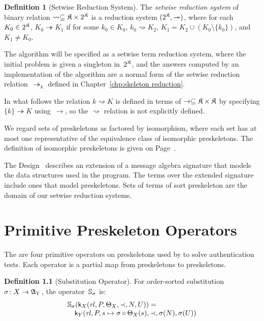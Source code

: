 \documentclass[12pt]{report}
\theoremstyle{definition}
\newtheorem{defn}{Definition}[chapter]
\newcommand{\skel}{\mathsf{k}}
\newcommand{\rl}{\fn{rl}}
\begin{document}
\begin{defn}[Setwise Reduction System]
The \emph{setwise reduction system} of
binary relation $\rightsquigarrow\subseteq\mathfrak K\times2^{\mathfrak K}$
is a reduction system $(2^{\mathfrak K},\twoheadrightarrow)$, where for
each $K_0\in2^{\mathfrak K}$, $K_0\twoheadrightarrow K_1$ if for some
$k_0\in K_0$, $k_0\rightsquigarrow K_2$, $K_1=K_2\cup
(K_0\setminus\{k_0\})$, and $K_1\neq K_0$.
\end{defn}

The {\cpsa} algorithm will be specified as a setwise term reduction
system, where the initial problem is given a singleton
in~$2^{\mathfrak K}$, and the answers computed by an implementation of
the algorithm are a normal form of the setwise reduction
relation~$\twoheadrightarrow_k$ defined in Chapter~\ref{chp:skeleton
  reduction}.

In what follows the relation $k\rightsquigarrow K$ is defined in terms
of $\to\subseteq\mathfrak K\times\mathfrak K$ by specifying
$\{k\}\twoheadrightarrow K$ using~$\to$, so the $\rightsquigarrow$
relation is not explicitly defined.

We regard sets of preskeletons as factored by isomorphism, where each
set has at most one representative of the equivalence class of
isomorphic preskeletons.  The definition of isomorphic preskeletons
is given on Page~\pageref{def:isomorphic preskeletons}.

The {\cpsa} Design~\cite{cpsadesign09} describes an extension of a
message algebra signature that models the data structures used in the
{\cpsa} program.  The terms over the extended signature include ones
that model preskeletons.  Sets of terms of sort preskeleton are the
domain of our setwise reduction systems.

\chapter{Primitive Preskeleton Operators}\label{chp:prim preskel ops}

The are four primitive operators on preskeletons used
by {\cpsa} to solve authentication tests.  Each operator is a partial
map from preskeletons to preskeletons.

\begin{defn}[Substitution Operator]\label{def:substitution operator}
For order-sorted substitution~$\sigma\colon X\to\mathfrak A_Y$,
the operator~$\mathbb S_\sigma$ is:
$$\begin{array}{l}
\ops{S}_\sigma(\skel_X(\rl,P,\Theta_X,\prec,N,U)) = {}\\
\quad\skel_Y(\rl,P,
s\mapsto \comp\sigma{\Theta_X(s)},\prec,\sigma(N), \sigma(U))
\end{array}$$
\end{defn}
\end{document}
